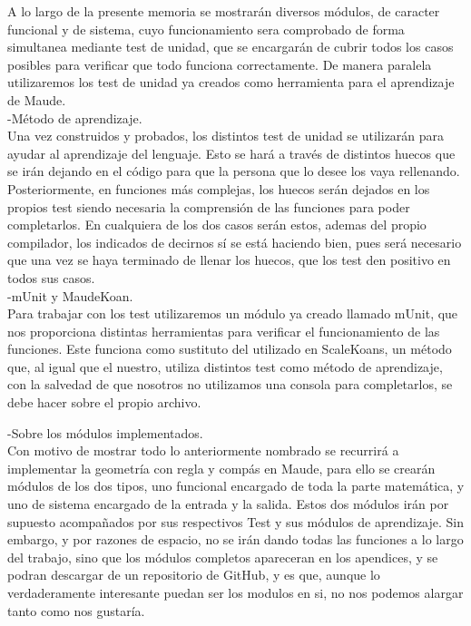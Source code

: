 A lo largo de la presente memoria se mostrarán diversos módulos, de caracter funcional y de sistema, cuyo funcionamiento sera comprobado de forma simultanea mediante test de unidad, que se encargarán de cubrir todos los casos posibles para verificar que todo funciona correctamente. De manera paralela utilizaremos los test de unidad ya creados como herramienta para el aprendizaje de Maude. \\

-Método de aprendizaje. \\

Una vez construidos y probados, los distintos test de unidad se utilizarán para ayudar al aprendizaje del lenguaje. Esto se hará a través de distintos huecos que se irán dejando en el código para que la persona que lo desee los vaya rellenando. Posteriormente, en funciones más complejas, los huecos serán dejados en los propios test siendo necesaria la comprensión de las funciones para poder completarlos. En cualquiera de los dos casos serán estos, ademas del propio compilador, los indicados de decirnos sí se está haciendo bien, pues será necesario que una vez se haya terminado de llenar los huecos, que los test den positivo en todos sus casos.\\

-mUnit y MaudeKoan. \\

Para trabajar con los test utilizaremos un módulo ya creado llamado mUnit, que nos proporciona distintas herramientas para verificar el funcionamiento de las funciones. Este funciona como sustituto del utilizado en ScaleKoans, un método que, al igual que el nuestro, utiliza distintos test como método de aprendizaje, con la salvedad de que nosotros no utilizamos una consola para completarlos, se debe hacer sobre el propio archivo.

-Sobre los módulos implementados.\\

Con motivo de mostrar todo lo anteriormente nombrado se recurrirá a implementar la geometría con regla y compás en Maude, para ello se crearán módulos de los dos tipos, uno funcional encargado de toda la parte matemática, y uno de sistema encargado de la entrada y la salida. Estos dos módulos irán por supuesto acompañados por sus respectivos Test y sus módulos de aprendizaje. Sin embargo, y por razones de espacio, no se irán dando todas las funciones a lo largo del trabajo, sino que los módulos completos apareceran en los apendices, y se podran descargar de un repositorio de GitHub, y es que, aunque lo verdaderamente interesante puedan ser los modulos en si, no nos podemos alargar tanto como nos gustaría.\\

